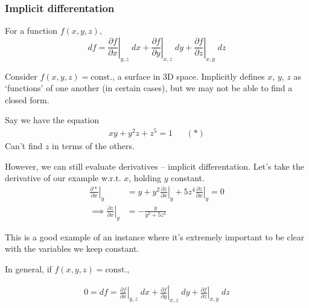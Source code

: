 \documentclass{../template/note}
\begin{document}
    \subsubsection{Implicit differentation}

    \begin{proposition}
        For a function \(f(x, y, z)\),
        \[
            df = \left.\frac{\partial f}{\partial x}\right|_{y, z}\; dx + \left.\frac{\partial f}{\partial y}\right|_{x, z}\; dy + \left.\frac{\partial f}{\partial z}\right|_{x, y}\; dz
        \]
    \end{proposition}
    
    Consider \(f(x, y, z) = \text{const.}\), a surface in 3D space. Implicitly defines \(x\), \(y\), \(z\) as `functions' of one another (in certain cases), but we may not be able to find a closed form.

    \begin{example}
        Say we have the equation
        \begin{align*}
            xy + y^2z + z^5 = 1 && (*)
        \end{align*}
        Can't find \(z\) in terms of the others.
    \end{example}
    
    However, we can still evaluate derivatives -- implicit differentation. Let's take the derivative of our example w.r.t. \(x\), holding \(y\) constant.
    \begin{align*}
        \left.\frac{\partial *}{\partial x}\right|_y &= y + y^2 \left.\frac{\partial z}{\partial x}\right|_y  + 5z^4 \left.\frac{\partial z}{\partial x}\right|_y  = 0 \\
        \implies \left.\frac{\partial z}{\partial x}\right|_y &= -\frac{y}{y^2+5z^4}
    \end{align*}
    
    

    This is a good example of an instance where it's extremely important to be clear with the variables we keep constant.

    In general, if \(f(x, y, z) = \text{const.}\),

    \begin{align*}
        0 = df = \left.\frac{\partial f}{\partial x}\right|_{y, z}\; dx + \left.\frac{\partial f}{\partial y}\right|_{x, z}\; dy + \left.\frac{\partial f}{\partial z}\right|_{x, y}\; dz
    \end{align*}
    
\end{document}
